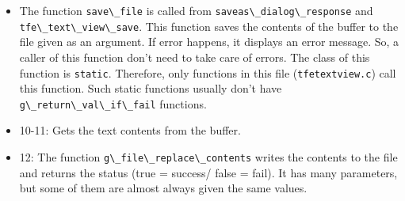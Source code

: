 \begin{itemize}
\tightlist
\item
  The function \passthrough{\lstinline!save\_file!} is called from
  \passthrough{\lstinline!saveas\_dialog\_response!} and
  \passthrough{\lstinline!tfe\_text\_view\_save!}. This function saves
  the contents of the buffer to the file given as an argument. If error
  happens, it displays an error message. So, a caller of this function
  don't need to take care of errors. The class of this function is
  \passthrough{\lstinline!static!}. Therefore, only functions in this
  file (\passthrough{\lstinline!tfetextview.c!}) call this function.
  Such static functions usually don't have
  \passthrough{\lstinline!g\_return\_val\_if\_fail!} functions.
\item
  10-11: Gets the text contents from the buffer.
\item
  12: The function \passthrough{\lstinline!g\_file\_replace\_contents!}
  writes the contents to the file and returns the status (true =
  success/ false = fail). It has many parameters, but some of them are
  almost always given the same values.


\end{itemize}
